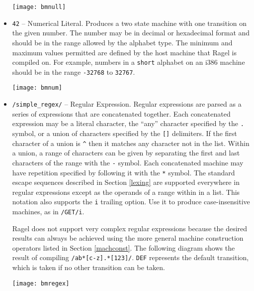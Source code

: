 \documentclass[letterpaper,11pt,oneside]{book}
\newcommand{\graphspace}{\vspace{10pt}}
\begin{document}
\begin{itemize}
\graphspace
\begin{center}
\texttt{[image: bmnull]}
\end{center}
\graphspace

\item \verb|42| -- Numerical Literal. Produces a two state machine with one
transition on the given number. The number may be in decimal or hexadecimal
format and should be in the range allowed by the alphabet type. The minimum and
maximum values permitted are defined by the host machine that Ragel is compiled
on. For example, numbers in a \verb|short| alphabet on an i386 machine should
be in the range \verb|-32768| to \verb|32767|.


\graphspace
\begin{center}
\texttt{[image: bmnum]}
\end{center}
\graphspace

\item \verb|/simple_regex/| -- Regular Expression. Regular expressions are
parsed as a series of expressions that are concatenated together. Each
concatenated expression
may be a literal character, the ``any'' character specified by the \verb|.|
symbol, or a union of characters specified by the \verb|[]| delimiters. If the
first character of a union is \verb|^| then it matches any character not in the
list. Within a union, a range of characters can be given by separating the first
and last characters of the range with the \verb|-| symbol. Each
concatenated machine may have repetition specified by following it with the
\verb|*| symbol. The standard escape sequences described in Section
\ref{lexing} are supported everywhere in regular expressions except as the
operands of a range within in a list. This notation also supports the \verb|i|
trailing option. Use it to produce case-insensitive machines, as in \verb|/GET/i|.

Ragel does not support very complex regular expressions because the desired
results can always be achieved using the more general machine construction
operators listed in Section \ref{machconst}. The following diagram shows the
result of compiling \verb|/ab*[c-z].*[123]/|. \verb|DEF| represents the default
transition, which is taken if no other transition can be taken. 


\graphspace
\begin{center}
\texttt{[image: bmregex]}
\end{center}
\graphspace


\end{itemize}
\end{document}
